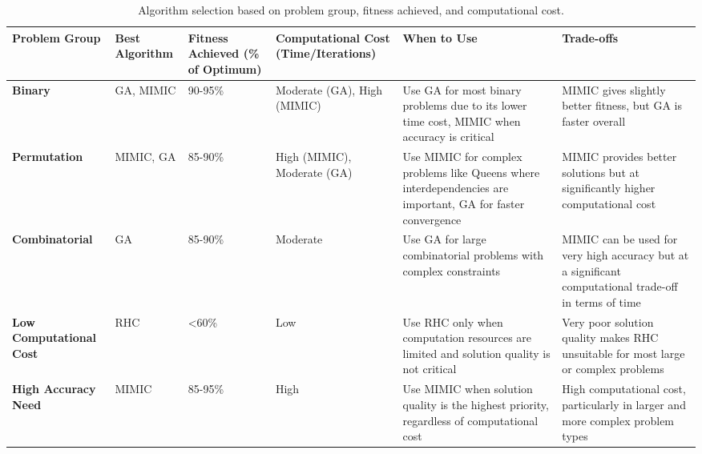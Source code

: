 \begin{table}[h!]
\centering
\caption{Algorithm selection based on problem group, fitness achieved, and computational cost.}
\begin{tabular}{|p{2cm}|p{1cm}|p{2cm}|p{2cm}|p{4cm}|p{4cm}|}
\hline
\textbf{Problem Group}       & \textbf{Best Algorithm} & \textbf{Fitness Achieved (\% of Optimum)} & \textbf{Computational Cost (Time/Iterations)} & \textbf{When to Use}                                                                                       & \textbf{Trade-offs}                                                                                               \\ \hline
\textbf{Binary}              & GA, MIMIC               & 90-95\%                                    & Moderate (GA), High (MIMIC)                    & Use GA for most binary problems due to its lower time cost, MIMIC when accuracy is critical                  & MIMIC gives slightly better fitness, but GA is faster overall                                                      \\ \hline
\textbf{Permutation}         & MIMIC, GA               & 85-90\%                                    & High (MIMIC), Moderate (GA)                    & Use MIMIC for complex problems like Queens where interdependencies are important, GA for faster convergence  & MIMIC provides better solutions but at significantly higher computational cost                                     \\ \hline
\textbf{Combinatorial}       & GA                      & 85-90\%                                    & Moderate                                       & Use GA for large combinatorial problems with complex constraints                                             & MIMIC can be used for very high accuracy but at a significant computational trade-off in terms of time             \\ \hline
\textbf{Low Computational Cost} & RHC                   & \textless{}60\%                            & Low                                            & Use RHC only when computation resources are limited and solution quality is not critical                     & Very poor solution quality makes RHC unsuitable for most large or complex problems                                 \\ \hline
\textbf{High Accuracy Need}  & MIMIC                   & 85-95\%                                    & High                                           & Use MIMIC when solution quality is the highest priority, regardless of computational cost                    & High computational cost, particularly in larger and more complex problem types                                     \\ \hline
\end{tabular}
\end{table}